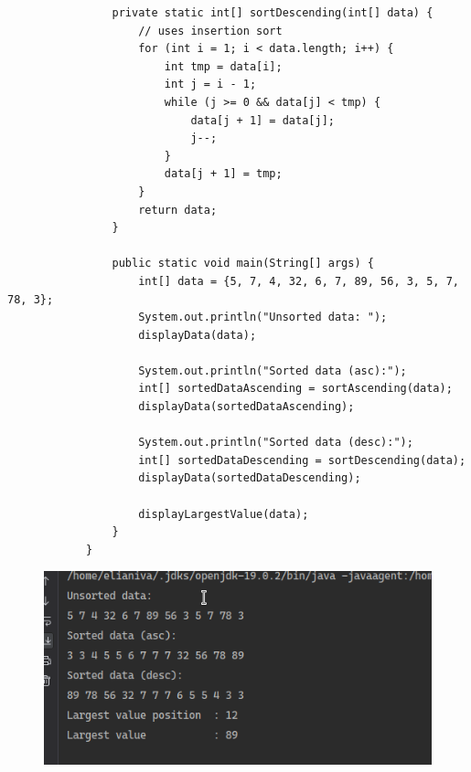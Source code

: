 \documentclass[12pt,titlepage]{article}
\begin{document}
\begin{enumerate}
{\begin{verbatim}
                private static int[] sortDescending(int[] data) {
                    // uses insertion sort
                    for (int i = 1; i < data.length; i++) {
                        int tmp = data[i];
                        int j = i - 1;
                        while (j >= 0 && data[j] < tmp) {
                            data[j + 1] = data[j];
                            j--;
                        }
                        data[j + 1] = tmp;
                    }
                    return data;
                }

                public static void main(String[] args) {
                    int[] data = {5, 7, 4, 32, 6, 7, 89, 56, 3, 5, 7, 78, 3};
                    System.out.println("Unsorted data: ");
                    displayData(data);

                    System.out.println("Sorted data (asc):");
                    int[] sortedDataAscending = sortAscending(data);
                    displayData(sortedDataAscending);

                    System.out.println("Sorted data (desc):");
                    int[] sortedDataDescending = sortDescending(data);
                    displayData(sortedDataDescending);

                    displayLargestValue(data);
                }
            }
        \end{verbatim}

        \begin{figure}[h]
            \centering
            \includegraphics[width=.8\textwidth]{./images/1d-output.png}
        \end{figure}
    }
\end{enumerate}
\end{document}
